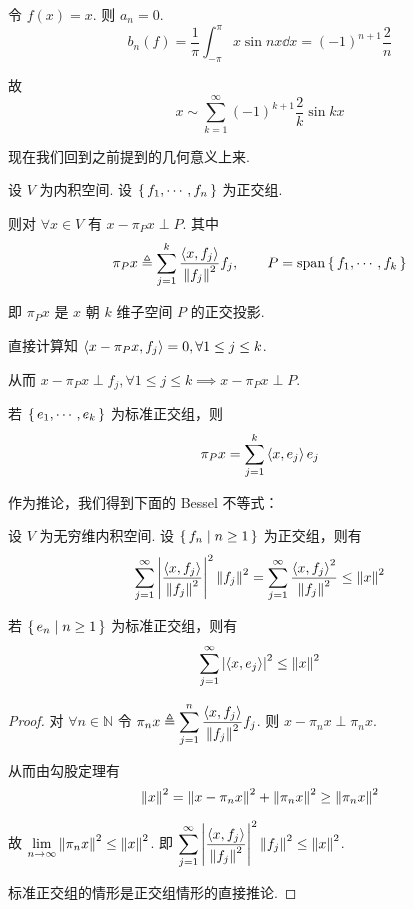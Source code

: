 \begin{example}
    令 $f(x)=x$. 则 $a_n=0$.
$$
b_n(f)=\frac{1}{\pi}\int_{-\pi}^{\pi}x\sin nx\dd x=(-1)^{n+1}\frac{2}{n}
$$

    故
$$
x\sim\sum_{k=1}^\infty (-1)^{k+1}\frac{2}{k}\sin kx
$$
\end{example}


现在我们回到之前提到的几何意义上来.

\begin{property}
    设 $V$ 为内积空间. 设 $\set{f_1,\cdots,f_n}$ 为正交组.

    则对 $\forall x\in V$ 有 $x-\pi_Px\perp P$. 其中
$$
\pi_Px\triangleq\sum_{j=1}^k\frac{\left\langle{x,f_j}\right\rangle}{\left\lVert{f_j}\right\rVert^2}f_j,\qquad P=\mathrm{span}\set{f_1,\cdots,f_k}
$$

    即 $\pi_Px$ 是 $x$ 朝 $k$ 维子空间 $P$ 的正交投影.
\end{property}
\begin{property}
    直接计算知 $\left\langle{x-\pi_Px,f_j}\right\rangle=0,\forall 1\le j\le k$.

    从而 $x-\pi_Px\perp f_j,\forall 1\le j\le k\implies x-\pi_Px\perp P$.
\end{property}

\begin{hint}
    若 $\set{e_1,\cdots,e_k}$ 为标准正交组，则
$$
\pi_Px=\sum_{j=1}^k\left\langle{x,e_j}\right\rangle e_j
$$
\end{hint}

作为推论，我们得到下面的 Bessel 不等式：

\begin{property}
    设 $V$ 为无穷维内积空间. 设 $\set{f_n|n\ge 1}$ 为正交组，则有
$$
\sum_{j=1}^\infty\left\lvert{\frac{\left\langle{x,f_j}\right\rangle}{\left\lVert{f_j}\right\rVert^2}}\right\rvert^2\left\lVert{f_j}\right\rVert^2=\sum_{j=1}^\infty\frac{\left\langle{x,f_j}\right\rangle^2}{\left\lVert{f_j}\right\rVert^2}\le\left\lVert{x}\right\rVert^2
$$

    若 $\set{e_n|n\ge 1}$ 为标准正交组，则有
$$
\sum_{j=1}^\infty\left\lvert{\left\langle{x,e_j}\right\rangle}\right\rvert^2\le\left\lVert{x}\right\rVert^2
$$
\end{property}
\begin{proof}
    对 $\forall n\in\mathbb{N}$ 令 $\pi_nx\triangleq\displaystyle\sum_{j=1}^n\frac{\left\langle{x,f_j}\right\rangle}{\left\lVert{f_j}\right\rVert^2}f_j$. 则 $x-\pi_nx\perp\pi_nx$.

    从而由勾股定理有
$$
\left\lVert{x}\right\rVert^2=\left\lVert{x-\pi_nx}\right\rVert^2+\left\lVert{\pi_nx}\right\rVert^2\ge\left\lVert{\pi_nx}\right\rVert^2
$$

    故 $\lim\limits_{n\to\infty}\left\lVert{\pi_nx}\right\rVert^2\le\left\lVert{x}\right\rVert^2$. 即 $\displaystyle\sum_{j=1}^\infty\left\lvert{\frac{\left\langle{x,f_j}\right\rangle}{\left\lVert{f_j}\right\rVert^2}}\right\rvert^2\left\lVert{f_j}\right\rVert^2\le\left\lVert{x}\right\rVert^2$.

    标准正交组的情形是正交组情形的直接推论.
\end{proof}

